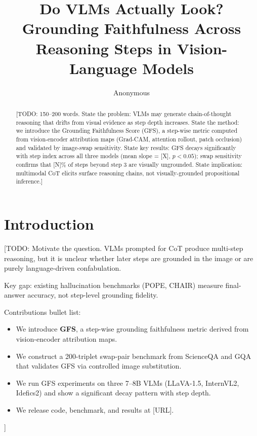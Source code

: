 \documentclass{colm2026}
\title{Do VLMs Actually Look? \\
Grounding Faithfulness Across Reasoning Steps in Vision-Language Models}
\author{Anonymous}
\begin{document}
\maketitle

\begin{abstract}
[TODO: 150--200 words.
State the problem: VLMs may generate chain-of-thought reasoning that drifts from
visual evidence as step depth increases.
State the method: we introduce the Grounding Faithfulness Score (GFS), a step-wise
metric computed from vision-encoder attribution maps (Grad-CAM, attention rollout,
patch occlusion) and validated by image-swap sensitivity.
State key results: GFS decays significantly with step index across all three models
(mean slope = [X], $p < 0.05$); swap sensitivity confirms that [N]\% of steps
beyond step 3 are visually ungrounded.
State implication: multimodal CoT elicits surface reasoning chains, not
visually-grounded propositional inference.]
\end{abstract}

\section{Introduction}
\label{sec:intro}

[TODO: Motivate the question. VLMs prompted for CoT produce multi-step reasoning,
but it is unclear whether later steps are grounded in the image or are purely
language-driven confabulation.

Key gap: existing hallucination benchmarks (POPE, CHAIR) measure final-answer
accuracy, not step-level grounding fidelity.

Contributions bullet list:
\begin{itemize}
  \item We introduce \textbf{GFS}, a step-wise grounding faithfulness metric
        derived from vision-encoder attribution maps.
  \item We construct a 200-triplet swap-pair benchmark from ScienceQA and GQA
        that validates GFS via controlled image substitution.
  \item We run GFS experiments on three 7--8B VLMs (LLaVA-1.5, InternVL2, Idefics2)
        and show a significant decay pattern with step depth.
  \item We release code, benchmark, and results at [URL].
\end{itemize}]
\end{document}
